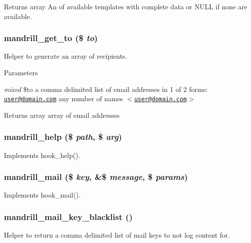 \begin{DoxyReturn}{Returns}
array An of available templates with complete data or NULL if none are available. 
\end{DoxyReturn}
\hypertarget{mandrill_8module_ac4fe15812a9e519069233d0493339caf}{
\subsubsection[{mandrill\_\-get\_\-to}]{\setlength{\rightskip}{0pt plus 5cm}mandrill\_\-get\_\-to (\$ {\em to})}}
\label{mandrill_8module_ac4fe15812a9e519069233d0493339caf}
Helper to generate an array of recipients.


\begin{DoxyParams}{Parameters}
\item[{\em mixed}]\$to a comma delimited list of email addresses in 1 of 2 forms: \href{mailto:user@domain.com}{\tt user@domain.com} any number of names $<$\href{mailto:user@domain.com}{\tt user@domain.com}$>$\end{DoxyParams}
\begin{DoxyReturn}{Returns}
array array of email addresses 
\end{DoxyReturn}
\hypertarget{mandrill_8module_a3352d7dded081944f440fae1bebfe334}{
\subsubsection[{mandrill\_\-help}]{\setlength{\rightskip}{0pt plus 5cm}mandrill\_\-help (\$ {\em path}, \/  \$ {\em arg})}}
\label{mandrill_8module_a3352d7dded081944f440fae1bebfe334}
Implements hook\_\-help(). \hypertarget{mandrill_8module_a671b5ea2005ac860f0f0107655b40553}{
\subsubsection[{mandrill\_\-mail}]{\setlength{\rightskip}{0pt plus 5cm}mandrill\_\-mail (\$ {\em key}, \/  \&\$ {\em message}, \/  \$ {\em params})}}
\label{mandrill_8module_a671b5ea2005ac860f0f0107655b40553}
Implements hook\_\-mail(). \hypertarget{mandrill_8module_ac9823b256c5cfab79f065b345f9aaaa9}{
\subsubsection[{mandrill\_\-mail\_\-key\_\-blacklist}]{\setlength{\rightskip}{0pt plus 5cm}mandrill\_\-mail\_\-key\_\-blacklist ()}}
\label{mandrill_8module_ac9823b256c5cfab79f065b345f9aaaa9}
Helper to return a comma delimited list of mail keys to not log content for.

